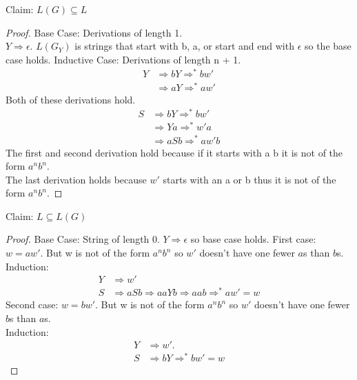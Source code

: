 \begin{problem}{2}
  \begin{solution}
    Claim: $L(G) \subseteq L$
    \begin{proof}
      Base Case: Derivations of length 1.\\
      $Y \Rightarrow \epsilon$. $L(G_Y)$ is strings that start with b, a, or start and end with $\epsilon$ so the base case holds.
      \br
      Inductive Case: Derivations of length n + 1. \\
      \begin{align*}
        Y &\Rightarrow bY \Rightarrow^* bw' \\
          &\Rightarrow aY \Rightarrow^* aw'
      \end{align*}
      Both of these derivations hold.
      \begin{align*}
        S &\Rightarrow bY \Rightarrow^* bw' \\
          &\Rightarrow Ya \Rightarrow^* w'a \\
          &\Rightarrow aSb \Rightarrow^* aw'b
      \end{align*}
      The first and second derivation hold because if it starts with a b it is not of the form $a^nb^n$. \\
      The last derivation holds because $w'$ starts with an a or b thus it is not of the form $a^nb^n$.
    \end{proof}
    \noindent Claim: $L \subseteq L(G)$
    \begin{proof}
      Base Case: String of length 0. $Y \Rightarrow \epsilon$ so base case holds.
      \br
      First case: $w = aw'$. But w is not of the form $a^nb^n$ so $w'$ doesn't have one fewer $a$s than $b$s. \\
      Induction:
      \begin{align*}
        Y &\Rightarrow w' \\
        S &\Rightarrow aSb \Rightarrow aaYb \Rightarrow aab \Rightarrow^* aw' = w
      \end{align*}
      Second case: $w = bw'$. But w is not of the form $a^nb^n$ so $w'$ doesn't have one fewer $b$s than $a$s.\\
      Induction:\\
      \begin{align*}
        Y &\Rightarrow w'. \\
        S &\Rightarrow bY \Rightarrow^* bw' = w
      \end{align*}
    \end{proof}
  \end{solution}
\end{problem}

